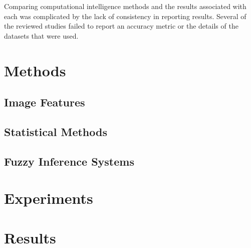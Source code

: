 \documentclass[12pt]{report}
\begin{document}
Comparing computational intelligence methods and the results associated with each was complicated by the lack of consistency in reporting results. Several of the reviewed studies failed to report an accuracy metric or the details of the datasets that were used.

\chapter{Methods}

\section{Image Features}

\section{Statistical Methods}

\section{Fuzzy Inference Systems}

\chapter{Experiments}


\chapter{Results}
\end{document}
